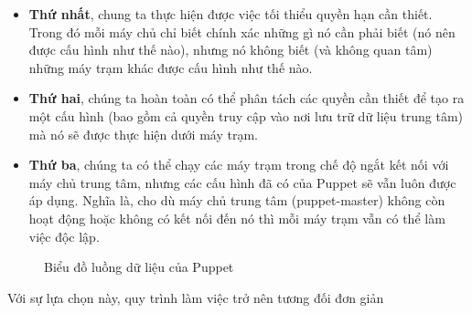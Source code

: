 \begin{itemize}
\item \textbf{Thứ nhất}, chung ta thực hiện được việc tối thiểu quyền hạn cần thiết. Trong đó mỗi máy chủ chỉ biết chính xác những gì nó cần phải biết (nó nên được cấu hình như thế nào), nhưng nó không biết (và không quan tâm) những máy trạm khác được cấu hình như thế nào.

\item \textbf{Thứ hai}, chúng ta hoàn toàn có thể phân tách các quyền cần thiết để tạo ra một cấu hình (bao gồm cả quyền truy cập vào nơi lưu trữ dữ liệu trung tâm) mà nó sẽ được thực hiện dưới máy trạm.

\item \textbf{Thứ ba}, chúng ta có thể chạy các máy trạm trong chế độ ngắt kết nối với máy chủ trung tâm, nhưng các cấu hình đã có của Puppet sẽ vẫn luôn được áp dụng. Nghĩa là, cho dù máy chủ trung tâm (puppet-master) không còn hoạt động hoặc không có kết nối đến nó thì mỗi máy trạm vẫn có thể làm việc độc lập.

\end{itemize}

\begin{figure}[h!]
    \begin{center}
    \end{center}
    \caption{Biểu đồ luồng dữ liệu của Puppet}
    \label{fig:puppet_dataflow}
\end{figure}

Với sự lựa chọn này, quy trình làm việc trở nên tương đối đơn giản


